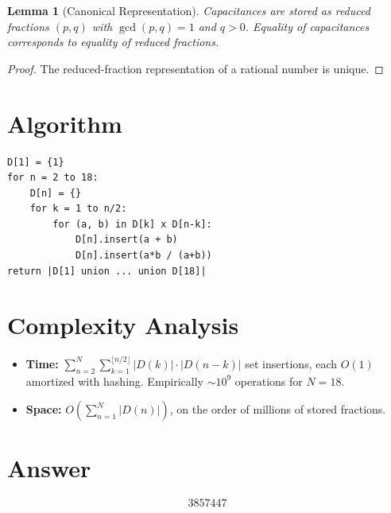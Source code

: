 \documentclass[12pt]{article}
\newtheorem{lemma}[theorem]{Lemma}
\begin{document}
\begin{lemma}[Canonical Representation]
Capacitances are stored as reduced fractions $(p, q)$ with $\gcd(p,q) = 1$ and $q > 0$. Equality of capacitances corresponds to equality of reduced fractions.
\end{lemma}

\begin{proof}
The reduced-fraction representation of a rational number is unique.
\end{proof}

\section{Algorithm}

\begin{verbatim}
D[1] = {1}
for n = 2 to 18:
    D[n] = {}
    for k = 1 to n/2:
        for (a, b) in D[k] x D[n-k]:
            D[n].insert(a + b)
            D[n].insert(a*b / (a+b))
return |D[1] union ... union D[18]|
\end{verbatim}

\section{Complexity Analysis}

\begin{itemize}
    \item \textbf{Time:} $\sum_{n=2}^{N} \sum_{k=1}^{\lfloor n/2 \rfloor} |D(k)| \cdot |D(n-k)|$ set insertions, each $O(1)$ amortized with hashing. Empirically $\sim 10^9$ operations for $N = 18$.
    \item \textbf{Space:} $O\!\left(\sum_{n=1}^{N} |D(n)|\right)$, on the order of millions of stored fractions.
\end{itemize}

\section{Answer}

\[
\boxed{3857447}
\]
\end{document}
